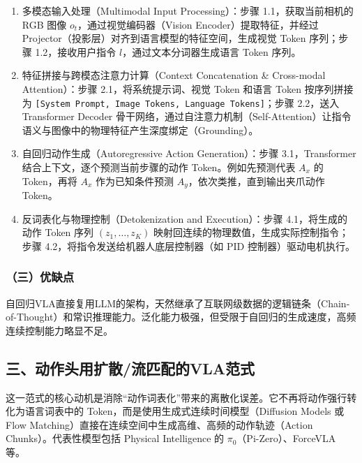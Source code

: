 \begin{enumerate}
\def\labelenumi{\arabic{enumi}.}
\item
  多模态输入处理（Multimodal Input Processing）：步骤 1.1，获取当前相机的 RGB 图像 \(o_t\)，通过视觉编码器（Vision Encoder）提取特征，并经过 Projector（投影层）对齐到语言模型的特征空间，生成视觉 Token 序列；步骤 1.2，接收用户指令 \(l\)，通过文本分词器生成语言 Token 序列。
\item
  特征拼接与跨模态注意力计算（Context Concatenation \& Cross-modal Attention）：步骤 2.1，将系统提示词、视觉 Token 和语言 Token 按序列拼接为 \texttt{{[}System\ Prompt,\ Image\ Tokens,\ Language\ Tokens{]}}；步骤 2.2，送入 Transformer Decoder 骨干网络，通过自注意力机制（Self-Attention）让指令语义与图像中的物理特征产生深度绑定（Grounding）。
\item
  自回归动作生成（Autoregressive Action Generation）：步骤 3.1，Transformer 结合上下文，逐个预测当前步骤的动作 Token。例如先预测代表 \(A_x\) 的 Token，再将 \(A_x\) 作为已知条件预测 \(A_y\)，依次类推，直到输出夹爪动作 Token。
\item
  反词表化与物理控制（Detokenization and Execution）：步骤 4.1，将生成的动作 Token 序列 \((z_1,\ldots,z_K)\) 映射回连续的物理数值，生成实际控制指令；步骤 4.2，将指令发送给机器人底层控制器（如 PID 控制器）驱动电机执行。
\end{enumerate}

\hypertarget{ux4e09ux4f18ux7f3aux70b9}{%
\subsubsection{（三）优缺点}\label{ux4e09ux4f18ux7f3aux70b9}}

自回归VLA直接复用LLM的架构，天然继承了互联网级数据的逻辑链条（Chain-of-Thought）和常识推理能力。泛化能力极强，但受限于自回归的生成速度，高频连续控制能力略显不足。

\hypertarget{ux4e09ux52a8ux4f5cux5934ux7528ux6269ux6563ux6d41ux5339ux914dux7684vlaux8303ux5f0f}{%
\subsection{三、动作头用扩散/流匹配的VLA范式}\label{ux4e09ux52a8ux4f5cux5934ux7528ux6269ux6563ux6d41ux5339ux914dux7684vlaux8303ux5f0f}}

这一范式的核心动机是消除``动作词表化''带来的离散化误差。它不再将动作强行转化为语言词表中的 Token，而是使用生成式连续时间模型（Diffusion Models 或 Flow Matching）直接在连续空间中生成高维、高频的动作轨迹（Action Chunks）。代表性模型包括 Physical Intelligence 的 \(\pi_0\)（Pi-Zero）、ForceVLA 等。

